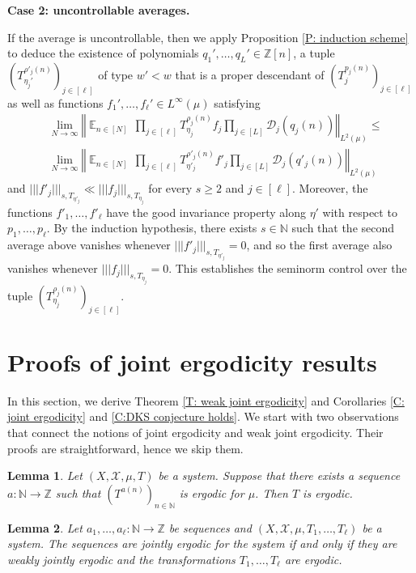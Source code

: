 \documentclass[11pt]{amsart}
\newtheorem{lemma}{Lemma}[section]
\theoremstyle{definition}
\newcommand{\N}{{\mathbb N}}
\newcommand{\Z}{{\mathbb Z}}
\newcommand{\CD}{{\mathcal D}}
\newcommand{\CX}{{\mathcal X}}
\newcommand{\norm}[1]{\left\Vert #1\right\Vert}
\newcommand{\nnorm}[1]{\lvert\!|\!| #1|\!|\!\rvert}
\DeclareMathOperator*{\E}{\mathbb{E}}
\newcommand{\brac}[1]{\mathopen{}\left( #1 \mathclose{}\right)}
\begin{document}
\smallskip
\textbf{Case 2: uncontrollable averages.}
\smallskip

If the average is uncontrollable, then we apply Proposition \ref{P: induction scheme} to deduce the existence of polynomials $q_1', \ldots, q_L'\in\Z[n]$, a tuple $\brac{T_{\eta_j'}^{\rho'_j(n)}}_{j\in[\ell]}$ of type $w'<w$ that is a proper descendant of $\brac{T_j^{p_j(n)}}_{j\in[\ell]}$ as well as functions $f_1', \ldots, f_\ell'\in L^\infty(\mu)$ satisfying
\begin{align*}
    &\lim_{N\to\infty}\norm{\E_{n\in [N]} \,\prod_{j\in[\ell]}T_{{\eta_j}}^{\rho_j(n)}f_j \prod_{j\in[L]}\CD_{j}(q_j(n))}_{L^2(\mu)}\leq \\
     &\lim_{N\to\infty}\norm{\E_{n\in [N]} \,\prod_{j\in[\ell]}T_{{\eta'_j}}^{\rho'_j(n)}f'_j \prod_{j\in[L]}\CD_{j}(q'_j(n))}_{L^2(\mu)}
\end{align*}
and $\nnorm{f'_j}_{s, T_{\eta'_j}}\ll \nnorm{f_j}_{s, T_{\eta_j}}$ for every $s\geq 2$ and $j\in[\ell]$. Moreover, the functions $f'_1, \ldots, f'_\ell$ have the good invariance property along $\eta'$ with respect to $p_1, \ldots, p_\ell$. By the induction hypothesis, there exists $s\in\N$ such that the second average above vanishes whenever $\nnorm{f'_j}_{s, T_{\eta'_j}}=0$, and so the first average also vanishes whenever $\nnorm{f_j}_{s, T_{\eta_j}}=0$. This establishes the seminorm control over the tuple $\brac{T_{\eta_j}^{\rho_j(n)}}_{j\in[\ell]}$.

\section{Proofs of joint ergodicity results}\label{S: other proofs}
In this section, we derive Theorem \ref{T: weak joint ergodicity} and Corollaries \ref{C: joint ergodicity} and \ref{C:DKS conjecture holds}. We start with two observations that connect the notions of joint ergodicity and weak joint ergodicity. Their proofs are straightforward, hence we skip them.
\begin{lemma}\label{L:ergodic sequence}
Let $(X, \CX, \mu, T)$ be a system. Suppose that there exists a sequence $a:\N\to\Z$ such that $(T^{a(n)})_{n\in\N}$ is ergodic for $\mu$. Then $T$ is ergodic.
\end{lemma}
\begin{lemma}\label{L:joint vs. weak joint}
Let $a_1, \ldots, a_\ell:\N\to\Z$ be sequences and $(X, \CX, \mu, T_1, \ldots, T_\ell)$ be a system. The sequences are jointly ergodic for the system if and only if they are weakly jointly ergodic and the transformations $T_1, \ldots, T_\ell$ are ergodic.
\end{lemma}
\end{document}
